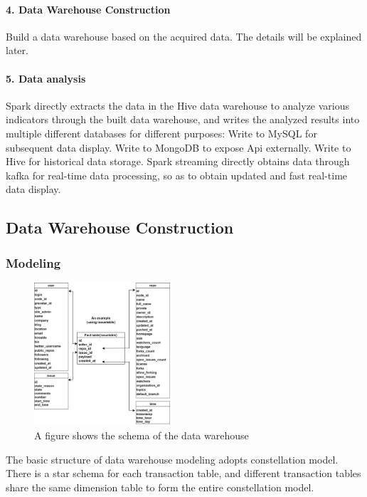 \paragraph*{4. Data Warehouse Construction}
Build a data warehouse based on the acquired data. The details will be explained later.

\paragraph*{5. Data analysis}
Spark directly extracts the data in the Hive data warehouse to analyze various indicators through the built data warehouse, and writes the analyzed results into multiple different databases for different purposes:
Write to MySQL for subsequent data display.
Write to MongoDB to expose Api externally.
Write to Hive for historical data storage.
Spark streaming directly obtains data through kafka for real-time data processing, so as to obtain updated and fast real-time data display.




\subsection{Data Warehouse Construction}



\subsubsection{Modeling}


\begin{figure}[H]
    \centering
    \includegraphics[width=0.45\textwidth]{./pic/tables.png}
    \caption{A figure shows the schema of the data warehouse}
    \label{fig:tables}
\end{figure}



The basic structure of data warehouse modeling adopts constellation model. There is a star schema for each transaction table, and different transaction tables share the same dimension table to form the entire constellation model.

